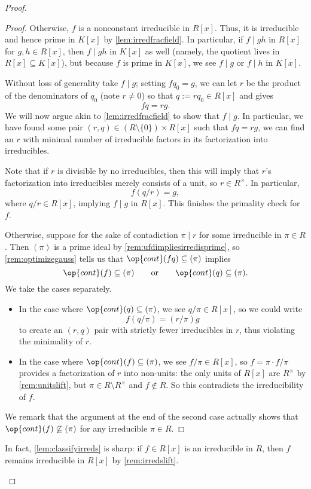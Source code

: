 \begin{proof}
\begin{proof}
		Otherwise, $f$ is a nonconstant irreducible in $R[x]$. Thus, it is irreducible and hence prime in $K[x]$ by \autoref{lem:irredfracfield}. In particular, if $f\mid gh$ in $R[x]$ for $g,h\in R[x]$, then $f\mid gh$ in $K[x]$ as well (namely, the quotient lives in $R[x]\subseteq K[x]$), but because $f$ is prime in $K[x]$, we see $f\mid g$ or $f\mid h$ in $K[x]$.

		Without loss of generality take $f\mid g$; setting $fq_0=g$, we can let $r$ be the product of the denominators of $q_0$ (note $r\ne0$) so that $q:=rq_0\in R[x]$ and gives
		\[fq=rg.\]
		We will now argue akin to \autoref{lem:irredfracfield} to show that $f\mid g$. In particular, we have found some pair $(r,q)\in(R\setminus\{0\})\times R[x]$ such that $fq=rg$, we can find an $r$ with minimal number of irreducible factors in its factorization into irreducibles.

		Note that if $r$ is divisible by no irreducibles, then this will imply that $r$'s factorization into irreducibles merely consists of a unit, so $r\in R^\times$. In particular,
		\[f(q/r)=g,\]
		where $q/r\in R[x]$, implying $f\mid g$ in $R[x]$. This finishes the primality check for $f$.

		Otherwise, suppose for the sake of contadiction $\pi\mid r$ for some irreducible in $\pi\in R$. Then $(\pi)$ is a prime ideal by \autoref{rem:ufdimpliesirredisprime}, so \autoref{rem:optimizegauss} tells us that $\op{cont}(fq)\subseteq(\pi)$ implies
		\[\op{cont}(f)\subseteq(\pi)\qquad\text{or}\qquad\op{cont}(q)\subseteq(\pi).\]
		We take the cases separately.
		\begin{itemize}
			\item In the case where $\op{cont}(q)\subseteq(\pi)$, we see $q/\pi\in R[x]$, so we could write
			\[f(q/\pi)=(r/\pi)g\]
			to create an $(r,q)$ pair with strictly fewer irreducibles in $r$, thus violating the minimality of $r$.
			\item In the case where $\op{cont}(f)\subseteq(\pi)$, we see $f/\pi\in R[x]$, so $f=\pi\cdot f/\pi$ provides a factorization of $r$ into non-units: the only units of $R[x]$ are $R^\times$ by \autoref{rem:unitslift}, but $\pi\in R\setminus R^\times$ and $f\notin R$. So this contradicts the irreducibility of $f$.
		\end{itemize}
		We remark that the argument at the end of the second case actually shows that $\op{cont}(f)\not\subseteq(\pi)$ for any irreducible $\pi\in R$.
	\end{proof}
	\begin{remark}[Nir] \label{rem:classifyirreds}
		In fact, \autoref{lem:classifyirreds} is sharp: if $f\in R[x]$ is an irreducible in $R$, then $f$ remains irreducible in $R[x]$ by \autoref{rem:irredslift}.
		

\end{remark}
\end{proof}
